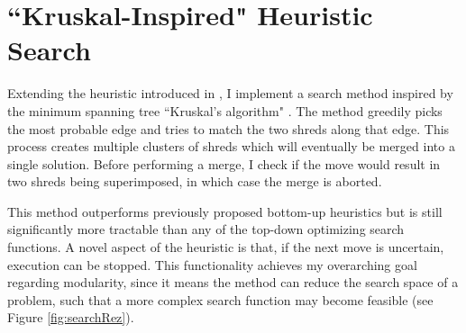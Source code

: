 \documentclass[letterpaper]{article}
\begin{document}
\section{
\fontsize{12pt}{15pt} 
\selectfont
``Kruskal-Inspired" Heuristic Search}
\fontsize{10pt}{12pt} 
\selectfont
Extending the heuristic introduced in \cite{P5}, I implement a search method inspired by the minimum spanning tree ``Kruskal's algorithm" \cite{P13}. The method greedily picks the most probable edge and tries to match the two shreds along that edge. This process creates multiple clusters of shreds which will eventually be merged into a single solution. Before performing a merge, I check if the move would result in two shreds being superimposed, in which case the merge is aborted.

This method outperforms previously proposed bottom-up heuristics but is still significantly more tractable than any of the top-down optimizing search functions. A novel aspect of the heuristic is that, if the next move is uncertain, execution can be stopped. This functionality achieves my overarching goal regarding modularity, since it means the method can reduce the search space of a problem, such that a more complex search function may become feasible (see Figure \ref{fig:searchRez}).
\end{document}
